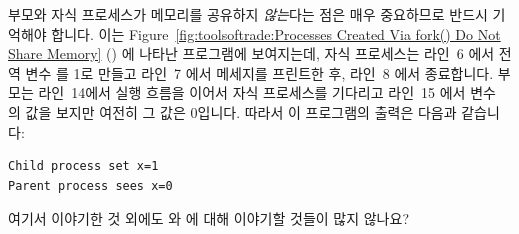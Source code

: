 부모와 자식 프로세스가 메모리를 공유하지 \emph{않는}다는 점은 매우 중요하므로
반드시 기억해야 합니다.
이는 Figure~\ref{fig:toolsoftrade:Processes Created Via fork() Do Not Share Memory}
() 에 나타난 프로그램에 보여지는데, 자식 프로세스는 라인~6
에서 전역 변수  를 1로 만들고 라인~7 에서 메세지를 프린트한 후, 라인~8
에서 종료합니다.
부모는 라인~14에서 실행 흐름을 이어서 자식 프로세스를 기다리고 라인~15 에서
변수  의 값을 보지만 여전히 그 값은 0입니다.
따라서 이 프로그램의 출력은 다음과 같습니다:

\vspace{5pt}
\begin{minipage}[t]{\columnwidth}
\scriptsize
\begin{verbatim}
Child process set x=1
Parent process sees x=0
\end{verbatim}
\end{minipage}
\vspace{5pt}

\QuickQuiz{}
	여기서 이야기한 것 외에도  와  에 대해 이야기할
	것들이 많지 않나요?


